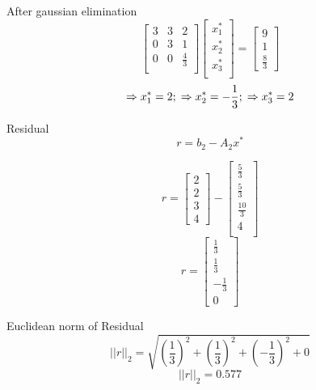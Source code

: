 \documentclass[unicode,11pt,a4paper,oneside,numbers=endperiod,openany]{scrartcl}
\begin{document}
\begin{itemize}
    {After gaussian elimination}
    \[
        \begin{bmatrix}
        3 & 3 & 2\\
        0 & 3 & 1 \\
        0 & 0 & \frac{4}{3} \\
        \end{bmatrix}
        \begin{bmatrix}
        x_1^* \\ x_2^* \\ x_3^* \\
        \end{bmatrix}
        =
        \begin{bmatrix}
        9 \\ 1 \\ \frac{8}{3}
        \end{bmatrix}
    \]
    \begin{equation}
	    \Rightarrow x_1^* = 2;
	    \\
	    \Rightarrow x_2^* = -\frac{1}{3};
	    \\
	    \Rightarrow x_3^* = 2
	\end{equation}
	
	
	{Residual}\\
	 \begin{equation}
	    r = b_2 - A_2x^*
	 \end{equation}
	 
	 \[
	    r = 
	    \begin{bmatrix}
        2 \\ 2 \\ 3 \\ 4
        \end{bmatrix}
        -
        \begin{bmatrix}
        \frac{5}{3} \\
        \frac{5}{3} \\
        \frac{10}{3} \\
        4 \\
        \end{bmatrix}
    \]
    \[
	    r = 
        \begin{bmatrix}
        \frac{1}{3} \\
        \frac{1}{3} \\
        -\frac{1}{3} \\
        0
        \end{bmatrix}
    \]
    
    {Euclidean norm of Residual}\\
     \begin{equation}
	    ||r||_2 = \sqrt{(\frac{1}{3})^2 + (\frac{1}{3})^2 + (-\frac{1}{3})^2 + 0}
	 \end{equation}
	 \begin{equation}
	    ||r||_2 = 0.577
	 \end{equation}
	 

\end{itemize}
\end{document}
